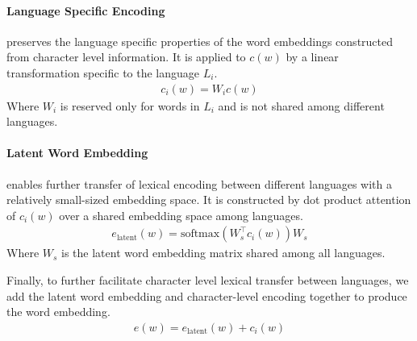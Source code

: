 \paragraph{Language Specific Encoding} preserves the language specific properties of the word embeddings constructed from character level information. It is applied to $c(w)$ by a linear transformation specific to the language $L_i$.
\begin{align}
    c_i(w) = W_i c(w)
\end{align}
Where $W_i$ is reserved only for words in $L_i$ and is not shared among different languages. 

\paragraph{Latent Word Embedding} enables further transfer of lexical encoding between different languages with a relatively small-sized embedding space. It is constructed by dot product attention \cite{} of $c_i(w)$ over a shared embedding space among languages.
\begin{align}
    e_{\text{latent}}(w) = \text{softmax}(W_s^{\top} c_i(w)) W_s
\end{align}
Where $W_s$ is the latent word embedding matrix shared among all languages.

Finally, to further facilitate character level lexical transfer between languages, we add the latent word embedding and character-level encoding together to produce the word embedding.
\begin{align}
    e(w) = e_{\text{latent}}(w) + c_i(w)
\end{align}
